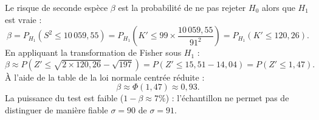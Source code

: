 {\begin{enumerate}
\begin{enumerate}
{				Le risque de seconde espèce $\beta$ est la probabilité de ne pas rejeter $H_0$ alors que $H_1$ est vraie :
				\[
				\beta = P_{H_1}\!\left(S^2 \le 10\,059{,}55\right) = P_{H_1}\!\left(K' \le 99 \times \frac{10\,059{,}55}{91^2}\right) = P_{H_1}\!\left(K' \le 120{,}26\right).
				\]
				En appliquant la transformation de Fisher sous $H_1$ :
				\[
				\beta \approx P\!\left(Z' \le \sqrt{2 \times 120{,}26} - \sqrt{197}\right) = P\!\left(Z' \le 15{,}51 - 14{,}04\right) = P\!\left(Z' \le 1{,}47\right).
				\]
				À l'aide de la table de la loi normale centrée réduite :
				\[
				\beta \approx \Phi(1{,}47) \approx 0{,}93.
				\]
				La puissance du test est faible ($1 - \beta \approx 7\%$) : l'échantillon ne permet pas de distinguer de manière fiable $\sigma = 90$ de $\sigma = 91$.
			}
			
		\end{enumerate}
		
	\end{enumerate}
}